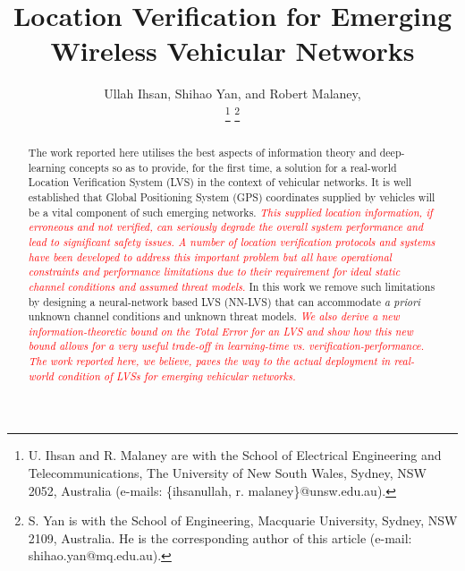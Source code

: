 \documentclass[journal]{IEEEtran}
\begin{document}

\title{Location Verification for Emerging Wireless Vehicular Networks}

\author{

Ullah Ihsan,  Shihao Yan,  and Robert Malaney, 

\thanks{U. Ihsan and R. Malaney are with the School of Electrical Engineering and Telecommunications, The University of New South Wales, Sydney, NSW 2052, Australia
(e-mails: \{ihsanullah, r. malaney\}@unsw.edu.au).}
\thanks{S. Yan is with the School of Engineering, Macquarie University, Sydney, NSW 2109, Australia. He is the corresponding author of this article (e-mail: shihao.yan@mq.edu.au).}
}


\maketitle

\begin{abstract}

The work reported here utilises the best aspects of information theory and deep-learning concepts so as to provide, for the first time, a solution for a real-world Location Verification System (LVS) in the context of vehicular networks. It is well established that Global Positioning System (GPS) coordinates supplied by vehicles will be a vital component of such emerging networks. \textcolor{red}{\textit{This supplied location information, if erroneous and not verified, can seriously degrade the overall system performance and lead to significant safety issues. A number of location verification protocols and systems \cite{sheet2016location,kasana2017location,yan2014optimal,yan2016location,yan2016LOCATION,monteiro2016information} have been developed to address this important problem but all have operational constraints and performance limitations due to their requirement for ideal static channel conditions and assumed threat models.}} In this work we remove such limitations by designing a neural-network based LVS (NN-LVS) that can accommodate \emph{a priori} unknown channel conditions and unknown threat models.
\textcolor{red}{\textit{We also derive a new information-theoretic bound on the Total Error for an LVS and show how this new bound allows for a very useful trade-off in learning-time \emph{vs}. verification-performance. The work reported here, we believe, paves the way to the actual deployment in real-world condition of LVSs for emerging vehicular networks.}}

\end{abstract}
\end{document}
